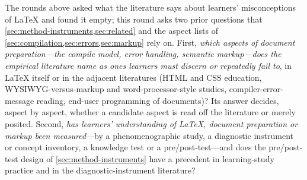 The rounds above asked what the literature says about learners'
misconceptions of LaTeX and found it empty; this round asks two prior
questions that \cref{sec:method-instruments,sec:related} and the aspect
lists of \cref{sec:compilation,sec:errors,sec:markup} rely on.
First, \emph{which aspects of document preparation---the compile model,
error handling, semantic markup---does the empirical literature name as
ones learners must discern or repeatedly fail to}, in LaTeX itself or in
the adjacent literatures (HTML and CSS education, WYSIWYG-versus-markup
and word-processor-style studies, compiler-error-message reading,
end-user programming of documents)?
Its answer decides, aspect by aspect, whether a candidate aspect is read
off the literature or merely posited.
Second, \emph{has learners' understanding of LaTeX, document preparation
or markup been measured}---by a phenomenographic study, a diagnostic
instrument or concept inventory, a knowledge test or a pre/post-test---and
does the pre/post-test design of \cref{sec:method-instruments} have a
precedent in learning-study practice and in the diagnostic-instrument
literature?

